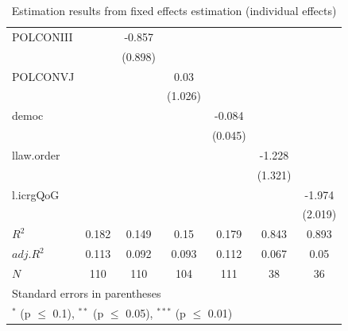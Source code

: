 \documentclass{article}\usepackage{graphicx, color}
\begin{document}
\begin{table}
\begin{tabular}{l*{6}{c}}
POLCONIII 		& 		&-0.857 		& 		& 		& 		& \\
  		& 		&(0.898) 		& 		& 		& 		& \\
POLCONVJ 		& 		& 		&0.03 		& 		& 		& \\
  		& 		& 		&(1.026) 		& 		& 		& \\
democ 		& 		& 		& 		&-0.084\sym{*} 		& 		& \\
  		& 		& 		& 		&(0.045) 		& 		& \\
llaw.order 		& 		& 		& 		& 		&-1.228 		& \\
  		& 		& 		& 		& 		&(1.321) 		& \\
l.icrgQoG 		& 		& 		& 		& 		& 		&-1.974 \\
  		& 		& 		& 		& 		& 		&(2.019) \\
\hline
$R^2$ 		&0.182 		&0.149 		&0.15 		&0.179 		&0.843 		&0.893 \\
$adj.R^2$ 		&0.113 		&0.092 		&0.093 		&0.112 		&0.067 		&0.05 \\
$N$ 		&\multicolumn{1}{c}{110} 		&\multicolumn{1}{c}{110} 		&\multicolumn{1}{c}{104} 		&\multicolumn{1}{c}{111} 		&\multicolumn{1}{c}{38} 		&\multicolumn{1}{c}{36} \\
\hline\hline
\multicolumn{7}{l}{\footnotesize Standard errors in parentheses}\\
\multicolumn{7}{l}{\footnotesize $^{*}$ (p $\le$ 0.1), $^{**}$ (p $\le$ 0.05), $^{***}$ (p $\le$ 0.01)}\\
\end{tabular}
\caption{Estimation results from fixed effects estimation (individual effects)}
\label{tab:fe3}
\end{table}
\def\sym#1{\ifmmode^{#1}\else\(^{#1}\)\fi}
\end{document}
